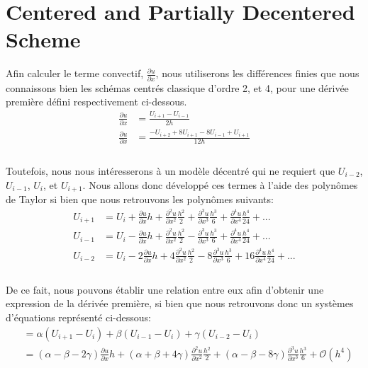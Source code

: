 \documentclass{article}
\begin{document}
\section{Centered and Partially Decentered Scheme}
Afin calculer le terme convectif, $\frac{\partial u}{\partial x}$, nous utiliserons les différences finies que nous connaissons bien les schémas centrés classique d'ordre 2, et 4, pour une dérivée première défini respectivement ci-dessous.
\begin{equation}
    \begin{aligned}
        \frac{\partial u }{\partial x} & = \frac{U_{i+1} - U_{i-1}}{2h}\\
        \frac{\partial u }{\partial x} & = \frac{-U_{i+2}+8U_{i+1}-8U_{i-1}+U_{i+1}}{12h}\\
    \end{aligned}
\end{equation}
\\
Toutefois, nous nous intéresserons à un modèle décentré qui ne requiert que $U_{i-2}$, $U_{i-1}$, $U_{i}$, et $U_{i+1}$. Nous allons donc développé ces termes à l'aide des polynômes de Taylor si bien que nous retrouvons les polynômes suivants:\\
\begin{equation}
    \begin{aligned}
        U_{i+1} & = U_i +  \frac{\partial u }{\partial x} h +  \frac{\partial^2 u }{\partial x^2} \frac{h^2}{2} + \frac{\partial^3 u }{\partial x^3} \frac{h^3}{6} + \frac{\partial^4 u }{\partial x^4} \frac{h^4}{24} + ... \\
        U_{i-1} & = U_i -  \frac{\partial u }{\partial x} h +  \frac{\partial^2 u }{\partial x^2} \frac{h^2}{2} - \frac{\partial^3 u }{\partial x^3} \frac{h^3}{6} + \frac{\partial^4 u }{\partial x^4} \frac{h^4}{24} + ... \\
        U_{i-2} & = U_i - 2 \frac{\partial u }{\partial x} h + 4 \frac{\partial^2 u }{\partial x^2} \frac{h^2}{2} - 8 \frac{\partial^3 u }{\partial x^3} \frac{h^3}{6} + 16 \frac{\partial^4 u }{\partial x^4} \frac{h^4}{24} + ... \\
    \end{aligned}
\end{equation}
\\
De ce fait, nous pouvons établir une relation entre eux afin d'obtenir une expression de la dérivée première, si bien que nous retrouvons donc un systèmes d'équations représenté ci-dessous:\\
\begin{equation}
\begin{aligned}
        &= \alpha ( U_{i+1} - U_i ) +   \beta ( U_{i-1} - U_i ) +  \gamma ( U_{i-2} - U_i )   \\
        &= (\alpha-\beta-2\gamma) \frac{\partial u }{\partial x} h + (\alpha+\beta+4\gamma) \frac{\partial^2 u }{\partial x^2} \frac{h^2}{2} +  (\alpha-\beta-8\gamma)  \frac{\partial^3 u }{\partial x^3} \frac{h^3}{6} + \mathcal{O}(h^4)\\
\end{aligned}
\end{equation}
\end{document}
